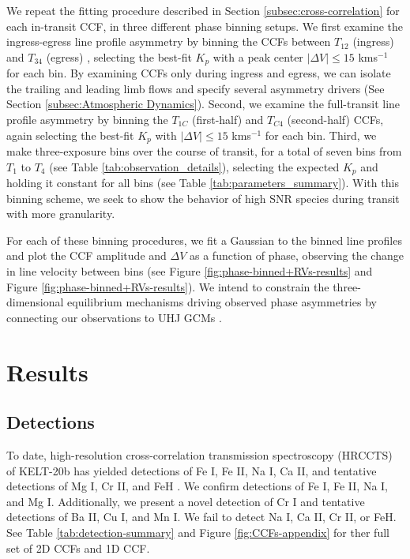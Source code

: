 \documentclass[twocolumn]{aastex631}
\begin{document}
            We repeat the fitting procedure described in Section \ref{subsec:cross-correlation} for each in-transit CCF, in three different phase binning setups. We first examine the ingress-egress line profile asymmetry by binning the CCFs between $T_{12}$ (ingress) and $T_{34}$ (egress) \citep{Lund2017}, selecting the best-fit $K_p$ with a peak center $|\Delta V| \leq 15$ kms$^{-1}$ for each bin. By examining CCFs only during ingress and egress, we can isolate the trailing and leading limb flows and specify several asymmetry drivers (See Section \ref{subsec:Atmospheric Dynamics}). Second, we examine the full-transit line profile asymmetry by binning the $T_{1C}$ (first-half) and $T_{C4}$ (second-half) CCFs, again selecting the best-fit $K_p$ with $|\Delta V| \leq 15$ kms$^{-1}$ for each bin. Third, we make three-exposure bins over the course of transit, for a total of seven bins from $T_1$ to $T_4$ (see Table \ref{tab:observation_details}), selecting the expected $K_p$ and holding it constant for all bins (see Table \ref{tab:parameters_summary}). With this binning scheme, we seek to show the behavior of high SNR species during transit with more granularity.
            
            For each of these binning procedures, we fit a Gaussian to the binned line profiles and plot the CCF amplitude and $\Delta V$ as a function of phase, observing the change in line velocity between bins (see Figure \ref{fig:phase-binned+RVs-results} and Figure \ref{fig:phase-binned+RVs-results}). We intend to constrain the three-dimensional equilibrium mechanisms driving observed phase asymmetries by connecting our observations to UHJ GCMs \citep{Savel2023}. 
            
            
            
    \section{Results}\label{sec:Results}

        
        \subsection{Detections}\label{subsec:Detections}

            To date, high-resolution cross-correlation transmission spectroscopy (HRCCTS) of KELT-20b has yielded detections of Fe I, Fe II, Na I, Ca II, and tentative detections of Mg I, Cr II, and FeH \citep{CasasayasBarris2019, Hoeijmakers2020, Nugroho2020, Rainer2021, Langeveld2022, Sicilia2022}. We confirm detections of Fe I, Fe II, Na I, and Mg I. Additionally, we present a novel detection of Cr I and tentative detections of Ba II, Cu I, and Mn I. We fail to detect Na I, Ca II, Cr II, or FeH. See Table \ref{tab:detection-summary} and Figure \ref{fig:CCFs-appendix} for ther full set of 2D CCFs and 1D CCF.
\end{document}
